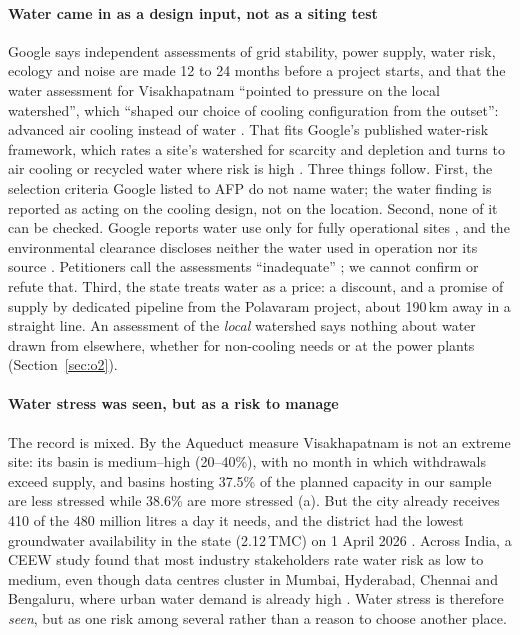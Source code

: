 \paragraph{Water came in as a design input, not as a siting test} Google says independent assessments of grid stability,
power supply, water risk, ecology and noise are made 12 to 24 months before a project starts, and that the water assessment for
Visakhapatnam ``pointed to pressure on the local watershed'', which ``shaped our choice of cooling configuration from the
outset'': advanced air cooling instead of water \citep{afp2026}. That fits Google's published water-risk framework, which
rates a site's watershed for scarcity and depletion and turns to air cooling or recycled water where risk is high
\citep{google2026env}. Three things follow. First, the selection criteria Google listed to AFP do not name water; the water finding is
reported as acting on the cooling design, not on the location. Second, none of it can be checked. Google reports water use
only for fully operational sites \citep{csm2026}, and the environmental clearance discloses neither the water used in operation nor its source
\citep{mongabay2026}. Petitioners call the assessments ``inadequate'' \citep{bs2026}; we cannot confirm or refute that.
Third, the state treats water as a price: a discount, and a promise of supply by dedicated pipeline from the Polavaram
project, about 190\,km away in a straight line. An assessment of the \emph{local} watershed says nothing about water
drawn from elsewhere, whether for non-cooling needs or at the power plants (Section~\ref{sec:o2}).

\paragraph{Water stress was seen, but as a risk to manage} The record is mixed. By the Aqueduct measure Visakhapatnam is not an
extreme site: its basin is medium--high (20--40\%), with no month in which withdrawals exceed supply, and basins hosting
37.5\% of the planned capacity in our sample are less stressed while 38.6\% are more stressed (a). But the
city already receives 410 of the 480 million litres a day it needs, and the district had the lowest groundwater availability in
the state (2.12\,TMC) on 1 April 2026 \citep{scroll2026}. Across India, a CEEW study found that most industry stakeholders rate water risk as low to medium, even though data
centres cluster in Mumbai, Hyderabad, Chennai and Bengaluru, where urban water demand is already high \citep{ceew2026}.
Water stress is therefore \emph{seen}, but as one risk among several rather than a reason to choose another place.

